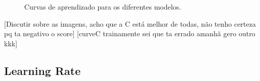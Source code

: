 \documentclass[conference]{IEEEtran}
\begin{document}
\begin{figure}[!h]
{{			
		}
	}
	\quad
	\caption{Curvas de aprendizado para os diferentes modelos.}
	\label{fig:learningcurves}
\end{figure}

[Discutir sobre as imagens, acho que a C está melhor de todas, não tenho certeza pq ta negativo o score] [curveC trainamente sei que ta errado amanhã gero outro kkk]

\subsection{Learning Rate}
\end{document}
